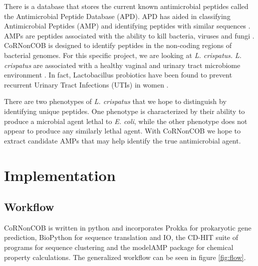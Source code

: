 \documentclass{article}
\begin{document}
There is a database that stores the current known antimicrobial peptides called the Antimicrobial Peptide Database (APD). APD has aided in classifying Antimicrobial Peptides (AMP) and identifying peptides with similar sequences \cite{wang_2004}. AMPs are peptides associated with the ability to kill bacteria, viruses and fungi \cite{izadpanah}. CoRNonCOB is designed to identify peptides in the non-coding regions of bacterial genomes. For this specific project, we are looking at \emph{L. crispatus.} \emph{L. crispatus} are associated with a healthy vaginal and urinary tract microbiome environment \cite{becknell_spencer_2015}. In fact, Lactobacillus probiotics have been found to prevent recurrent Urinary Tract Infections (UTIs) in women \cite{dwyer_dwyer_2012}.


There are two phenotypes of \emph{L. crispatus} that we hope to distinguish by identifying unique peptides. One phenotype is characterized by their ability to produce a microbial agent lethal to \emph{E. coli}, while the other phenotype does not appear to produce any similarly lethal agent. With CoRNonCOB we hope to extract candidate AMPs that may help identify the true antimicrobial agent.


\section{Implementation}

\subsection{Workflow}
CoRNonCOB is written in python and incorporates Prokka for prokaryotic gene prediction, BioPython for sequence translation and IO, the CD-HIT suite of programs for sequence clustering and the modelAMP package for chemical property
calculations. The generalized workflow can be seen in figure \ref{fig:flow}.
\end{document}
